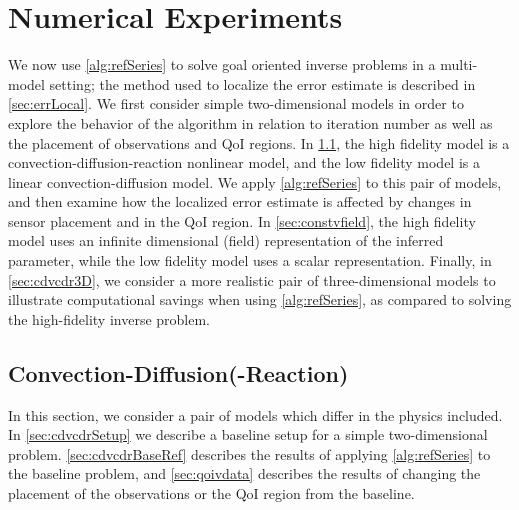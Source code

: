 \section{Numerical Experiments}\label{sect:numexp}
%
We now use \cref{alg:refSeries} to solve goal oriented inverse problems in a multi-model setting; the method used to localize the error estimate is described in \cref{sec:errLocal}. We first consider simple two-dimensional models in order to explore the behavior of the algorithm in relation to iteration number as well as the placement of observations and QoI regions. In \cref{sec:cdvcdr}, the high fidelity model is a convection-diffusion-reaction nonlinear model, and the low fidelity model is a linear convection-diffusion model. We apply \cref{alg:refSeries} to this pair of models, and then examine how the localized error estimate is affected by changes in sensor placement and in the QoI region. In \cref{sec:constvfield}, the high fidelity model uses an infinite dimensional (field) representation of the inferred parameter, while the low fidelity model uses a scalar representation.  Finally, in \cref{sec:cdvcdr3D}, we consider a more realistic pair of three-dimensional models to illustrate computational savings when using \cref{alg:refSeries}, as compared to solving the high-fidelity inverse problem.


\subsection{Convection-Diffusion(-Reaction)} \label{sec:cdvcdr}
In this section, we consider a pair of models which differ in the physics included. In \cref{sec:cdvcdrSetup} we describe a baseline setup for a simple two-dimensional problem. \cref{sec:cdvcdrBaseRef} describes the results of applying \cref{alg:refSeries} to the baseline problem, and \cref{sec:qoivdata} describes the results of changing the placement of the observations or the QoI region from the baseline.
%
